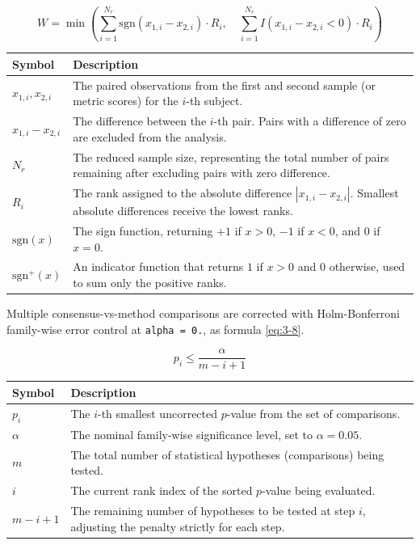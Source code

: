 \begin{equation}
	W = \min \left( \sum_{i=1}^{N_r} \text{sgn}(x_{1,i} - x_{2,i}) \cdot R_i , \quad \sum_{i=1}^{N_r} I(x_{1,i} - x_{2,i} < 0) \cdot R_i \right)
	\label{eq:3-7}
\end{equation}
\begin{center}
	\small
	\begin{tabular}{lp{9cm}}
		\toprule
		\textbf{Symbol} & \textbf{Description} \\
		\midrule
		$x_{1,i}, x_{2,i}$ & The paired observations from the first and second sample (or metric scores) for the $i$-th subject. \\
		$x_{1,i} - x_{2,i}$ & The difference between the $i$-th pair. Pairs with a difference of zero are excluded from the analysis. \\
		$N_r$ & The reduced sample size, representing the total number of pairs remaining after excluding pairs with zero difference. \\
		$R_i$ & The rank assigned to the absolute difference $|x_{1,i} - x_{2,i}|$. Smallest absolute differences receive the lowest ranks. \\
		$\text{sgn}(x)$ & The sign function, returning $+1$ if $x > 0$, $-1$ if $x < 0$, and $0$ if $x = 0$. \\
		$\text{sgn}^+(x)$ & An indicator function that returns $1$ if $x > 0$ and $0$ otherwise, used to sum only the positive ranks. \\
		\bottomrule
	\end{tabular}
\end{center}

Multiple consensus-vs-method comparisons are
corrected with Holm-Bonferroni family-wise error control
\cite{ref-holm-1979, ref-aickin-gensler-1996} at
\texttt{alpha\ =\ 0.}, as formula \eqref{eq:3-8}. 

\begin{equation}
	p_i \le \frac{\alpha}{m - i + 1}
	\label{eq:3-8}
\end{equation}

\begin{center}
	\small
	\begin{tabular}{lp{9cm}}
		\toprule
		\textbf{Symbol} & \textbf{Description} \\
		\midrule
		$p_i$ & The $i$-th smallest uncorrected $p$-value from the set of comparisons. \\
		$\alpha$ & The nominal family-wise significance level, set to $\alpha = 0.05$. \\
		$m$ & The total number of statistical hypotheses (comparisons) being tested. \\
		$i$ & The current rank index of the sorted $p$-value being evaluated. \\
		$m - i + 1$ & The remaining number of hypotheses to be tested at step $i$, adjusting the penalty strictly for each step. \\
		\bottomrule
	\end{tabular}
\end{center}

